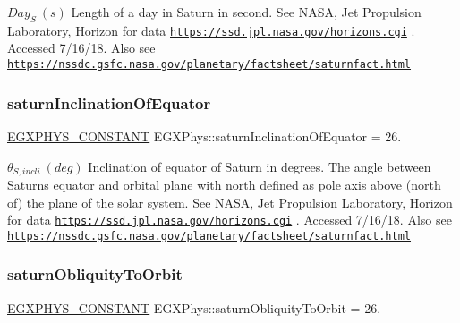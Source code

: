$ Day_{S} \ (s)$ Length of a day in Saturn in second. See N\+A\+SA, Jet Propulsion Laboratory, Horizon for data \href{https://ssd.jpl.nasa.gov/horizons.cgi}{\tt https\+://ssd.\+jpl.\+nasa.\+gov/horizons.\+cgi} . Accessed 7/16/18. Also see \href{https://nssdc.gsfc.nasa.gov/planetary/factsheet/saturnfact.html}{\tt https\+://nssdc.\+gsfc.\+nasa.\+gov/planetary/factsheet/saturnfact.\+html} \mbox{\label{group___e_g_x_phys-_constants-_astrophysics-_solar_system-_saturn-_orbit_gae7c69283a39f8924ecb9b2eafb194fa4}} 
\subsubsection{\texorpdfstring{saturn\+Inclination\+Of\+Equator}{saturnInclinationOfEquator}}
{\footnotesize\ttfamily \mbox{\hyperlink{group___e_g_x_phys-_constants-_macros_ga76980d288494ce1714c9ac68a95ba702}{E\+G\+X\+P\+H\+Y\+S\+\_\+\+C\+O\+N\+S\+T\+A\+NT}} E\+G\+X\+Phys\+::saturn\+Inclination\+Of\+Equator = 26.}

$ \theta_{S,incli} \ (deg)$ Inclination of equator of Saturn in degrees. The angle between Saturn\textquotesingle{}s equator and orbital plane with north defined as pole axis above (north of) the plane of the solar system. See N\+A\+SA, Jet Propulsion Laboratory, Horizon for data \href{https://ssd.jpl.nasa.gov/horizons.cgi}{\tt https\+://ssd.\+jpl.\+nasa.\+gov/horizons.\+cgi} . Accessed 7/16/18. Also see \href{https://nssdc.gsfc.nasa.gov/planetary/factsheet/saturnfact.html}{\tt https\+://nssdc.\+gsfc.\+nasa.\+gov/planetary/factsheet/saturnfact.\+html} \mbox{\label{group___e_g_x_phys-_constants-_astrophysics-_solar_system-_saturn-_orbit_gaf7253ccd382d96029431fcdaf85244e2}} 
\subsubsection{\texorpdfstring{saturn\+Obliquity\+To\+Orbit}{saturnObliquityToOrbit}}
{\footnotesize\ttfamily \mbox{\hyperlink{group___e_g_x_phys-_constants-_macros_ga76980d288494ce1714c9ac68a95ba702}{E\+G\+X\+P\+H\+Y\+S\+\_\+\+C\+O\+N\+S\+T\+A\+NT}} E\+G\+X\+Phys\+::saturn\+Obliquity\+To\+Orbit = 26.}

